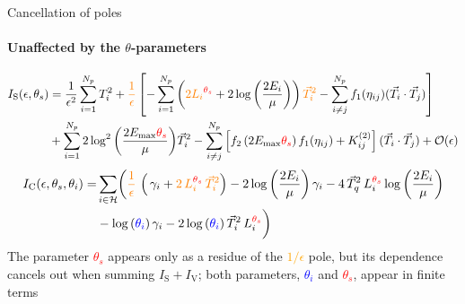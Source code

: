 \begin{frame} {Cancellation of poles}
  \framesubtitle{Unaffected by the $\theta$-parameters}
\begin{equation*}
  \begin{aligned}
  \textcolor{black}{I_{\mathrm{S}} (\epsilon, \theta_s)} &= \frac{1}{\epsilon^2}\sum_{i=1}^{N_p} T_i^2 + \textcolor{orange}{\frac{1}{\epsilon}}\left[-\sum_{i=1}^{N_p}  \left( \textcolor{orange}{2{L_i}^{\textcolor{red}{\theta_s}}} + 2 \log{\left(\frac{2 E_i}{\mu} \right) } \right) \textcolor{orange}{\vec{T}_i^2} - \sum_{i\neq j}^{N_p} f_1(\eta_{ij}) (\vec{T}_i \cdot \vec{T}_j) \right]  \\
  &  + \sum_{i=1}^{N_p} 2 \log^2{\left(\frac{2 E_{\mathrm{max}}\textcolor{red}{\theta_s}}{\mu} \right)}\vec{T}_i^2 - \sum_{i\neq j}^{N_p} \left[ f_2 \left(2 E_{\mathrm{max}}\textcolor{red}{\theta_s}\right) f_1(\eta_{ij}) + K_{ij}^{(2)}\right] (\vec{T}_i \cdot \vec{T}_j) + \mathcal{O}(\epsilon)
  \end{aligned}
  \label{pink}
\end{equation*}
\pause
  \begin{equation*}
  \begin{aligned}
    \textcolor{black}{I_{\mathrm{C}} (\epsilon, \theta_s, \theta_i)} = &\sum_{i \in \mathcal{H}} \biggl( \textcolor{orange}{\frac{1}{\epsilon}}\, \left(\, \gamma_i+  \textcolor{orange}{2 \,L_i^{\textcolor{red}{\theta_s}} \,\vec{T}_i^2} \right) - 2 \log{\left(\frac{2E_i}{\mu}\right)}\, \gamma_i  - 4 \, \vec{T}_q^2 \, L_i^{\textcolor{red}{\theta_s}} \log{\left(\frac{2E_i}{\mu}\right)} \\
    & - \log{(\textcolor{blue}{\theta_i})} \, \gamma_i - 2 \log{(\textcolor{blue}{\theta_i})} \, \vec{T}_i^2 \, L_i^{\textcolor{red}{\theta_s}} \biggr) 
    \label{green}
  \end{aligned}
\end{equation*}
\pause
The parameter \textcolor{red}{$\theta_s$} appears only as a residue of the \textcolor{orange}{$1/\epsilon$} pole, but its dependence cancels out when summing $I_{\mathrm{S}} + I_{\mathrm{V}}$; both parameters, \textcolor{blue}{$\theta_i$} and \textcolor{red}{$\theta_s$}, appear in finite terms 

\end{frame}


